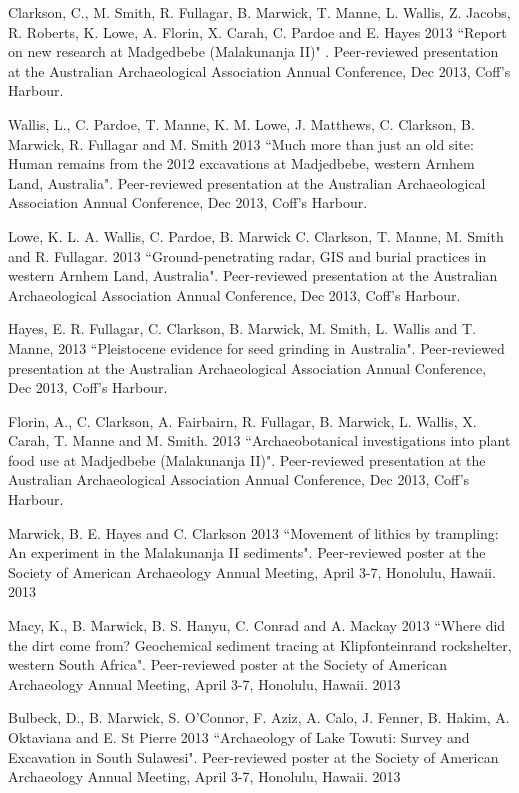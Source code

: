 \ind Clarkson, C., M. Smith, R. Fullagar, B. Marwick, T. Manne, L. Wallis, Z. Jacobs, R. Roberts, K. Lowe, A. Florin, X. Carah, C. Pardoe and E. Hayes 2013 ``Report on new research at Madgedbebe (Malakunanja II)" . Peer-reviewed presentation at the Australian Archaeological Association Annual Conference, Dec 2013, Coff’s Harbour.

\ind Wallis, L., C. Pardoe, T. Manne, K. M. Lowe, J. Matthews, C.   Clarkson, B. Marwick, R. Fullagar and M. Smith 2013 ``Much more than just an old site: Human remains from the 2012 excavations at Madjedbebe, western Arnhem Land, Australia". Peer-reviewed presentation at the Australian Archaeological Association Annual Conference, Dec 2013, Coff’s Harbour.

\ind Lowe, K. L. A. Wallis, C. Pardoe, B. Marwick C. Clarkson, T. Manne, M. Smith and R. Fullagar. 2013 ``Ground-penetrating radar, GIS and burial practices in western Arnhem Land, Australia". Peer-reviewed presentation at the Australian Archaeological Association Annual Conference, Dec 2013, Coff’s Harbour.

\ind Hayes, E.  R. Fullagar, C. Clarkson, B. Marwick, M. Smith, L. Wallis and T. Manne, 2013 ``Pleistocene evidence for seed grinding in Australia". Peer-reviewed presentation at the Australian Archaeological Association Annual Conference, Dec 2013, Coff’s Harbour.

\ind Florin, A., C. Clarkson, A. Fairbairn, R. Fullagar, B. Marwick, L. Wallis, X. Carah, T. Manne and M. Smith. 2013 ``Archaeobotanical investigations into plant food use at Madjedbebe (Malakunanja II)". Peer-reviewed presentation at the Australian Archaeological Association Annual Conference, Dec 2013, Coff’s Harbour.

\ind Marwick, B. E. Hayes and C. Clarkson 2013 ``Movement of lithics by trampling: An experiment in the Malakunanja II sediments". Peer-reviewed poster at the Society of American Archaeology Annual Meeting, April 3-7, Honolulu, Hawaii. 2013

\ind Macy, K., B. Marwick, B. S. Hanyu, C. Conrad and A. Mackay 2013 ``Where did the dirt come from? Geochemical sediment tracing at Klipfonteinrand rockshelter, western South Africa". Peer-reviewed poster at the Society of American Archaeology Annual Meeting, April 3-7, Honolulu, Hawaii. 2013

\ind Bulbeck, D., B. Marwick, S. O'Connor, F. Aziz, A. Calo, J. Fenner, B. Hakim, A. Oktaviana and E. St Pierre 2013 ``Archaeology of Lake Towuti: Survey and Excavation in South Sulawesi". Peer-reviewed poster at the Society of American Archaeology Annual Meeting, April 3-7, Honolulu, Hawaii. 2013

